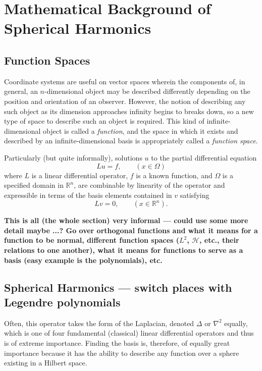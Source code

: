 \documentclass[11pt,dvipsnames]{thesis}
\begin{document}
\chapter{Mathematical Background of Spherical Harmonics}

\section{Function Spaces}
Coordinate systems are useful on vector spaces wherein the components of, in general, an $n$-dimensional object may be described differently depending on the position and orientation of an observer. However, the notion of describing any such object as its dimension approaches infinity begins to breaks down, so a new type of space to describe such an object is required. This kind of infinite-dimensional object is called a \textit{function}, and the space in which it exists and described by an infinite-dimensional basis is appropriately called a \textit{function space}.

Particularly (but quite informally), solutions $u$ to the partial differential equation
\begin{equation}
L u = f, \qquad (x \in \Omega)
\end{equation}
where $L$ is a linear differential operator, $f$ is a known function, and $\Omega$ is a specified domain in $\mathbb{R}^n$, are combinable by linearity of the operator and expressible in terms of the basis elements contained in $v$ satisfying
\begin{equation}
L v = 0, \qquad (x \in \mathbb{R}^n).
\end{equation}

\textbf{This is all (the whole section) very informal --- could use some more detail maybe ...? Go over orthogonal functions and what it means for a function to be normal, different function spaces ($L^2$, $\mathcal{H}$, etc., their relations to one another), what it means for functions to serve as a basis (easy example is the polynomials), etc.}

\section{Spherical Harmonics --- switch places with Legendre polynomials}
Often, this operator takes the form of the Laplacian, denoted $\Delta$ or $\nabla^2$ equally, which is one of four fundamental (classical) linear differential operators and thus is of extreme importance. Finding the basis is, therefore, of equally great importance because it has the ability to describe any function over a sphere existing in a Hilbert space.
\end{document}
